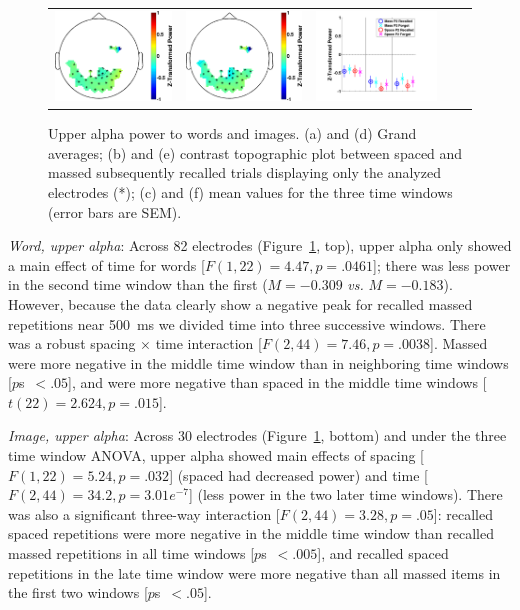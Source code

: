 \begin{figure}[H]
\begin{tabular}{ccccc}
  \includegraphics[width=.19\textwidth]{./figs/exp1/tfr_topocont_ga_img_RgH_rc_spac_p2vsimg_RgH_rc_mass_p2_30ROIs_11_12_0_500_-1p0_1p0_cb} &
  \includegraphics[width=.19\textwidth]{./figs/exp1/tfr_topocont_ga_img_RgH_rc_spac_p2vsimg_RgH_rc_mass_p2_30ROIs_11_12_520_1000_-1p0_1p0_cb} &
  \includegraphics[width=.30\textwidth]{./figs/exp1/tfr_avg_ga_img_RgH_rc_mass_p2_img_RgH_fo_mass_p2_img_RgH_rc_spac_p2_img_RgH_fo_spac_p2_30ROI_0_333_333_666_666_1000_11_12_ylabel} \\
  \end{tabular}
  \caption{Upper alpha power to words and images.  (a) and (d) Grand averages; (b) and (e) contrast topographic plot between spaced and massed subsequently recalled trials displaying only the analyzed electrodes (*); (c) and (f) mean values for the three time windows (error bars are SEM).}
  \label{fig:word_img_alpha_upp}
\end{figure}

\textit{Word, upper alpha}: Across 82 electrodes (Figure~\ref{fig:word_img_alpha_upp}, top), upper alpha only showed a main effect of time for words [$F(1,22)=4.47, p=.0461$]; there was less power in the second time window than the first ($M=-0.309$ \textit{vs.} $M=-0.183$).  However, because the data clearly show a negative peak for recalled massed repetitions near 500~ms we divided time into three successive windows.  There was a robust spacing $\times$ time interaction [$F(2,44)=7.46, p=.0038$].  Massed were more negative in the middle time window than in neighboring time windows [$p$s~$<.05$], and were more negative than spaced in the middle time windows [$t(22)=2.624, p=.015$].

\textit{Image, upper alpha}: Across 30 electrodes (Figure~\ref{fig:word_img_alpha_upp}, bottom) and under the three time window ANOVA, upper alpha showed main effects of spacing [$F(1,22)=5.24, p=.032$] (spaced had decreased power) and time [$F(2,44)=34.2, p=3.01e^{-7}$] (less power in the two later time windows).  There was also a significant three-way interaction [$F(2,44)=3.28, p=.05$]: recalled spaced repetitions were more negative in the middle time window than recalled massed repetitions in all time windows [$p$s~$<.005$], and recalled spaced repetitions in the late time window were more negative than all massed items in the first two windows [$p$s~$<.05$].

